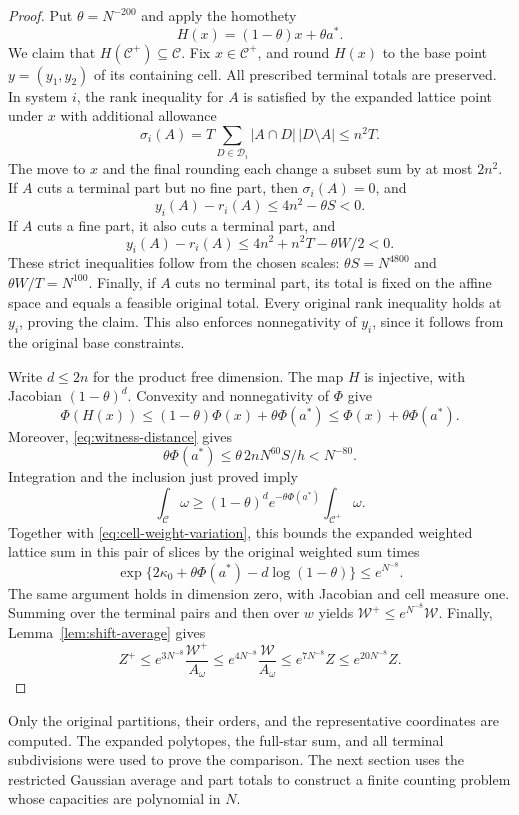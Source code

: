 \begin{proof}
Put \(\theta=N^{-200}\) and apply the homothety
\[
 H(x)=(1-\theta)x+\theta a^*.
\]
We claim that \(H(\mathcal C^+)\subseteq\mathcal C\).
Fix \(x\in\mathcal C^+\), and round \(H(x)\) to the base
point \(y=(y_1,y_2)\) of its containing cell.  All prescribed
terminal totals are preserved.  In system \(i\), the rank
inequality for \(A\) is satisfied by the expanded lattice point
under \(x\) with additional allowance
\[
 \sigma_i(A)=T\sum_{D\in\mathcal D_i}
                         |A\cap D|\,|D\setminus A|
 \le n^2T.
\]
The move to \(x\) and the final rounding each change a subset
sum by at most \(2n^2\).  If \(A\) cuts a terminal part but
no fine part, then \(\sigma_i(A)=0\), and
\[
 y_i(A)-r_i(A)\le 4n^2-\theta S<0.
\]
If \(A\) cuts a fine part, it also cuts a terminal part, and
\[
 y_i(A)-r_i(A)
 \le 4n^2+n^2T-\theta W/2<0.
\]
These strict inequalities follow from the chosen scales:
\(\theta S=N^{4800}\) and
\(\theta W/T=N^{100}\).  Finally, if \(A\) cuts no terminal
part, its total is fixed on the affine space and equals a
feasible original total.  Every original rank inequality holds
at \(y_i\), proving the claim.  This also enforces nonnegativity
of \(y_i\), since it follows from the original base constraints.

Write \(d\le2n\) for the product free dimension.  The map \(H\)
is injective, with Jacobian \((1-\theta)^d\).  Convexity and
nonnegativity of \(\Phi\) give
\[
 \Phi(H(x))\le(1-\theta)\Phi(x)+\theta\Phi(a^*)
                  \le\Phi(x)+\theta\Phi(a^*).
\]
Moreover, \eqref{eq:witness-distance} gives
\[
 \theta\Phi(a^*)
 \le\theta\,2nN^{60}S/h<N^{-80}.
\]
Integration and the inclusion just proved imply
\[
 \int_{\mathcal C}\omega
 \ge (1-\theta)^d e^{-\theta\Phi(a^*)}
                         \int_{\mathcal C^+}\omega.
\]
Together with \eqref{eq:cell-weight-variation}, this bounds the
expanded weighted lattice sum in this pair of slices by the
original weighted sum times
\[
 \exp\{2\kappa_0+\theta\Phi(a^*)-d\log(1-\theta)\}
 \le e^{N^{-8}}.
\]
The same argument holds in dimension zero, with Jacobian and
cell measure one.  Summing over the terminal pairs and then
over \(w\) yields \(\mathcal W^+\le e^{N^{-8}}\mathcal W\).
Finally, Lemma~\ref{lem:shift-average} gives
\[
 Z^+\le e^{3N^{-8}}\frac{\mathcal W^+}{A_\omega}
 \le e^{4N^{-8}}\frac{\mathcal W}{A_\omega}
 \le e^{7N^{-8}}Z\le e^{20N^{-8}}Z.
\]
\end{proof}

Only the original partitions, their orders, and the representative
coordinates are computed.  The expanded polytopes, the full-star
sum, and all terminal subdivisions were used to prove the
comparison.  The next section uses the restricted Gaussian
average and part totals to construct a finite counting problem
whose capacities are polynomial in \(N\).
